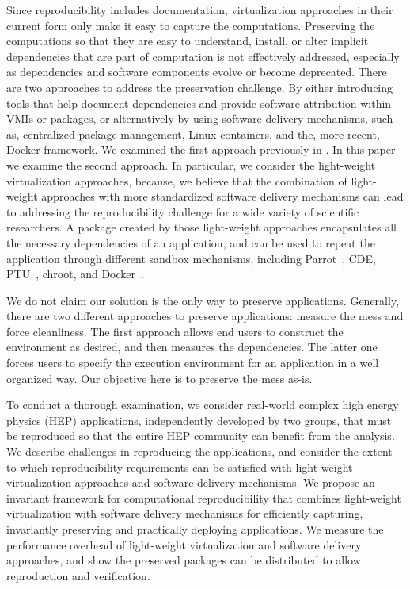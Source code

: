 Since reproducibility includes documentation, virtualization approaches in their current form only make it easy to capture the computations. Preserving the computations so that they are easy to understand, install, or alter implicit dependencies that are part of computation is not effectively addressed, especially as dependencies and software components evolve or become deprecated. There are two approaches to address the preservation challenge. By either introducing tools that help document dependencies and provide software attribution within VMIs or packages, or alternatively by using software delivery mechanisms, such as, centralized package management, Linux containers, and the, more recent, Docker framework. We examined the first approach previously in \cite{SoftProv}. 
In this paper we examine the second approach. 
In particular, we consider the light-weight virtualization approaches, because, we believe that the combination of light-weight approaches with more standardized software delivery mechanisms can lead to addressing the reproducibility challenge for a wide variety of scientific researchers. 
A package created by those light-weight approaches encapsulates all the necessary dependencies of an application, and can be used to repeat the application through different sandbox mechanisms, including Parrot~\cite{thain2005parrot}, CDE, PTU~\cite{PTU}, chroot, and Docker~\cite{boettiger2015introduction}.

We do not claim our solution is the only way to preserve applications. Generally, there are two different approaches to preserve applications: measure the mess and force cleanliness. The first approach allows end users to construct the environment as desired, and then measures the dependencies. The latter one forces users to specify the execution environment for an application in a well organized way.
Our objective here is to preserve the mess as-is.

To conduct a thorough examination, we consider real-world complex high energy physics (HEP) applications, independently developed by two groups, that must be reproduced so that the entire HEP community can benefit from the analysis. We describe challenges in reproducing the applications, and consider the extent to which reproducibility requirements can be satisfied with light-weight virtualization approaches and software delivery mechanisms. We propose an invariant framework for computational reproducibility that combines light-weight virtualization with software delivery mechanisms for efficiently capturing, invariantly preserving and practically deploying applications.
We measure the performance overhead of  light-weight virtualization and software delivery approaches, and show the preserved packages can be distributed to allow reproduction and verification.

